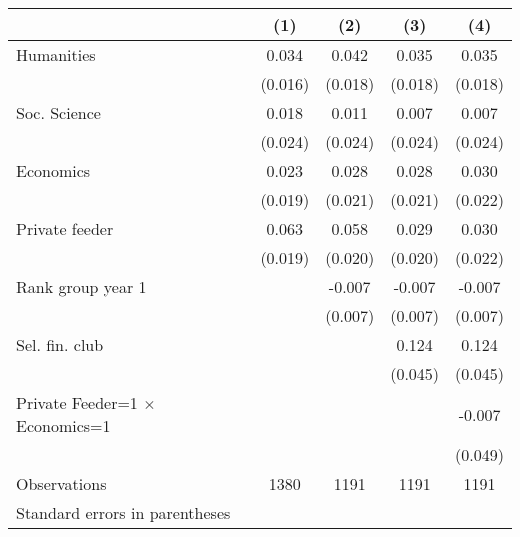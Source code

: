 \begin{tabular}{l*{4}{c}}
\toprule
                    &\multicolumn{1}{c}{(1)}&\multicolumn{1}{c}{(2)}&\multicolumn{1}{c}{(3)}&\multicolumn{1}{c}{(4)}\\
\midrule
Humanities          &       0.034&       0.042&       0.035&       0.035\\
                    &     (0.016)&     (0.018)&     (0.018)&     (0.018)\\
\addlinespace
Soc. Science        &       0.018&       0.011&       0.007&       0.007\\
                    &     (0.024)&     (0.024)&     (0.024)&     (0.024)\\
\addlinespace
Economics           &       0.023&       0.028&       0.028&       0.030\\
                    &     (0.019)&     (0.021)&     (0.021)&     (0.022)\\
\addlinespace
Private feeder      &       0.063&       0.058&       0.029&       0.030\\
                    &     (0.019)&     (0.020)&     (0.020)&     (0.022)\\
\addlinespace
Rank group year 1   &            &      -0.007&      -0.007&      -0.007\\
                    &            &     (0.007)&     (0.007)&     (0.007)\\
\addlinespace
Sel. fin. club      &            &            &       0.124&       0.124\\
                    &            &            &     (0.045)&     (0.045)\\
\addlinespace
Private Feeder=1 $\times$ Economics=1&            &            &            &      -0.007\\
                    &            &            &            &     (0.049)\\
\midrule
Observations        &        1380&        1191&        1191&        1191\\
\bottomrule
\multicolumn{5}{l}{\footnotesize Standard errors in parentheses}\\
\end{tabular}
